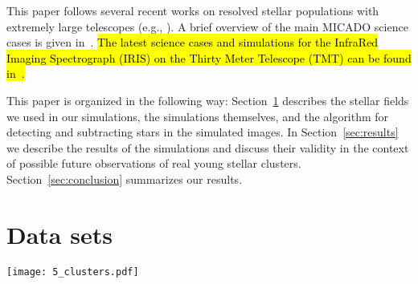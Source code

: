 \documentclass{aa}
\newcommand{\msun}{M$_\odot$~}
\newcommand{\msune}{M$_\odot$}
\begin{document}
This paper follows several recent works on resolved stellar populations with extremely large telescopes
(e.g., \citealt{deep11, greggio12, gullieuszik15, tolstoy19_iau}).
A brief overview of the main MICADO science cases is given in~\cite{micado2016}.
\hl{The latest science cases and simulations for the InfraRed Imaging Spectrograph (IRIS) on the Thirty Meter Telescope (TMT) can be found in~\cite{tmt_iris16}.}

This paper is organized in the following way: Section~\ref{sec:observations} describes the stellar fields we used in our simulations, the simulations themselves, and the algorithm for detecting and subtracting stars in the simulated images.
In Section~\ref{sec:results} we describe the results of the simulations and discuss their validity in the context of possible future observations of real young stellar clusters.
Section~\ref{sec:conclusion} summarizes our results.



\section{Data sets}
\label{sec:observations}


\begin{figure*}
    \centering
    \texttt{[image: 5\_clusters.pdf]}
    \caption{Illustration of the synthetic data.
    The model young massive cluster depicted here contains a mass of 2$\times$10$^4$\,\msun ($\sim$5$\times$10$^4$ stars) and has a half-light radius of 1\,pc.
    It contains stars in the mass range [0.01, 100]\msune, sampled from a Kroupa IMF.
    The model cluster was observed with the MICADO instrument simulator at distances from 8\,kpc to 800\,kpc.
    The top row shows the cluster as seen by the central detector of MICADO (covering an on-sky area of 16\arcsec$\times$16\arcsec).
    The bottom row shows a 2\arcsec$\times$2\arcsec window (512$\times$512 pixels) at the centre of this detector.
    This is the area we used for our study.
    Here the unique structure of the ELT PSF is visible.
    This figure illustrates the difficulties that observers will face when crowded fields are studied with MICADO and the ELT.
    }
    \label{fig:5_clusters}
\end{figure*}
\end{document}
